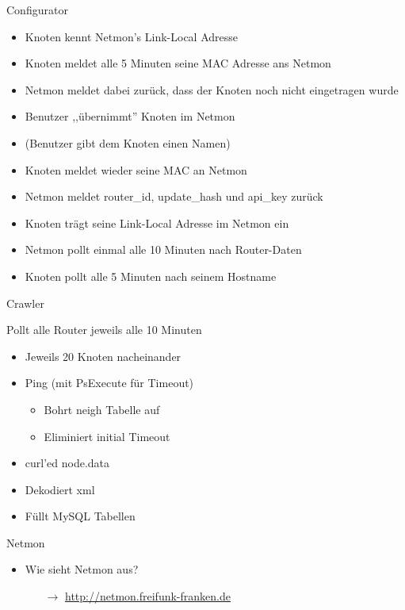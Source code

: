 \begin{frame}{Configurator}
    \begin{itemize}
        \item Knoten kennt Netmon's Link-Local Adresse
        \item Knoten meldet alle 5 Minuten seine MAC Adresse ans Netmon
        \item Netmon meldet dabei zurück, dass der Knoten noch nicht eingetragen wurde
        \item Benutzer ,,übernimmt'' Knoten im Netmon
        \item (Benutzer gibt dem Knoten einen Namen)
        \item Knoten meldet wieder seine MAC an Netmon
        \item Netmon meldet router\_id, update\_hash und api\_key zurück
        \item Knoten trägt seine Link-Local Adresse im Netmon ein
        \item Netmon pollt einmal alle 10 Minuten nach Router-Daten
        \item Knoten pollt alle 5 Minuten nach seinem Hostname
    \end{itemize}
\end{frame}

\begin{frame}{Crawler}
    \begin{block}{Pollt alle Router jeweils alle 10 Minuten}
        \begin{itemize}
            \item Jeweils 20 Knoten nacheinander
            \item Ping (mit PsExecute für Timeout)
            \begin{itemize}
                \item Bohrt neigh Tabelle auf
                \item Eliminiert initial Timeout
            \end{itemize}
            \item curl'ed node.data
            \item Dekodiert xml
            \item Füllt MySQL Tabellen
        \end{itemize}
    \end{block}
\end{frame}

\begin{frame}{Netmon}
    \begin{itemize}
        \item Wie sieht Netmon aus?
        \begin{itemize}
            \item[$\rightarrow$] \url{http://netmon.freifunk-franken.de}
        \end{itemize}
    \end{itemize}
\end{frame}
